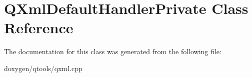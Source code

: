 \hypertarget{class_q_xml_default_handler_private}{}\section{Q\+Xml\+Default\+Handler\+Private Class Reference}
\label{class_q_xml_default_handler_private}


The documentation for this class was generated from the following file\+:\begin{DoxyCompactItemize}
\item 
doxygen/qtools/qxml.\+cpp\end{DoxyCompactItemize}
